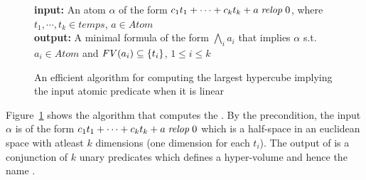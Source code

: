 \begin{figure}
\begin{algorithm}[H]
\textbf{input: } An atom $\alpha$ of the form $c_1t_1 + \cdots + c_kt_k + a \; \mathit{relop} \; 0$,
 where $t_1,\cdots,t_k \in temps$, $a \in Atom$ \\
\textbf{output: } A minimal formula of the form $\bigwedge_i a_i$ that implies $\alpha$ 
s.t. $a_i \in Atom$ and $\mathit{FV}(a_i) \subseteq \{ t_i \}$, $1 \le i \le k$ \\
 

\conle{$\alpha$}
\end{algorithm}
\caption{An efficient algorithm for computing the largest hypercube implying the input 
atomic predicate when it is linear} \label{fig:hypervol-algo}
\end{figure}

Figure~\ref{fig:hypervol-algo} shows the algorithm that computes the \hypervol.
By the precondition, the input $\alpha$ is of the form 
$c_1t_1 + \cdots + c_kt_k + a \; \mathit{relop} \; 0$ which is a half-space in an euclidean 
space with atleast $k$ dimensions (one dimension for each $t_i$).
The output of \hypervol is a conjunction of $k$ unary predicates which defines 
a hyper-volume and hence the name \hypervol.

